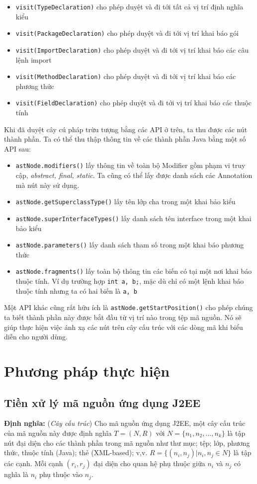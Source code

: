 \documentclass[12pt]{report}
\begin{document}
\begin{itemize}
	\item \texttt{visit(TypeDeclaration)} cho phép duyệt và đi tới tất cả vị trí định nghĩa kiểu
	\item \texttt{visit(PackageDeclaration)} cho phép duyệt và đi tới vị trí khai báo gói
	\item \texttt{visit(ImportDeclaration)} cho phép duyệt và đi tới vị trí khai báo các câu lệnh import
	\item \texttt{visit(MethodDeclaration)} cho phép duyệt và đi tới vị trí khai báo các phương thức
	\item \texttt{visit(FieldDeclaration)} cho phép duyệt và đi tới vị trí khai báo các thuộc tính
\end{itemize}

Khi đã duyệt cây cú pháp trừu tượng bằng các API ở trên, ta thu được các nút thành phần. Ta có thể thu thập thông tin về các thành phần Java bằng một số API sau:
\begin{itemize}
	\item \texttt{astNode.modifiers()} lấy thông tin về toàn bộ Modifier gồm phạm vi truy cập, \textit{abstract, final, static}. Ta cũng có thể lấy được danh sách các Annotation mà nút này sử dụng.
	\item \texttt{astNode.getSuperclassType()} lấy tên lớp cha trong một khai bảo kiểu
	\item \texttt{astNode.superInterfaceTypes()} lấy danh sách tên interface trong một khai bảo kiểu
	\item \texttt{astNode.parameters()} lấy danh sách tham số trong một khai báo phương thức
	\item \texttt{astNode.fragments()} lấy toàn bộ thông tin các biến có tại một nơi khai báo thuộc tính. Ví dụ trường hợp \texttt{int a, b;}, mặc dù chỉ có một lệnh khai báo thuộc tính nhưng ta có hai biến là \texttt{a, b}
\end{itemize}

Một API khác cũng rất hữu ích là \texttt{astNode.getStartPosition()} cho phép chúng ta biết thành phần này được bắt đầu từ vị trí nào trong tệp mã nguồn. Nó sẽ giúp thực hiện việc ánh xạ các nút trên cây cấu trúc với các dòng mã khi biểu diễn cho người dùng.

\newpage
\chapter{Phương pháp thực hiện}
\label{chap:approach}
\section{Tiền xử lý mã nguồn ứng dụng J2EE}
\textbf{Định nghĩa:} (\textit{Cây cấu trúc}) Cho mã nguồn ứng dụng J2EE, một cây cấu trúc của mã nguồn này được định nghĩa $T = (N, R)$ với $N = \{n_1, n_2,..., n_k\}$ là tập nút đại diện cho các thành phần trong mã nguồn như thư mục; tệp; lớp, phương thức, thuộc tính (Java); thẻ (XML-based); v,v. $R = \{(n_i, n_j) | n_i,n_j \in N\}$ là tập các cạnh. Mỗi cạnh $(r_i,r_j)$ đại diện cho quan hệ phụ thuộc giữa $n_i$ và $n_j$ có nghĩa là $n_i$ phụ thuộc vào $n_j$.
\end{document}
